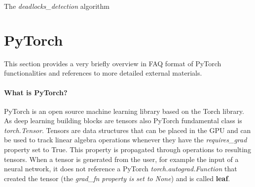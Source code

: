 \documentclass[11pt, a4paper, hidelinks]{report}
\begin{document}
\begin{algorithm}[H]


\caption{The \textit{deadlocks\_detection} algorithm}\label{alg:deadlocks}
\end{algorithm}

\newpage

\section{PyTorch}\label{sec:pytorch}
This section provides a very briefly overview in FAQ format of PyTorch functionalities and references to more detailed external materials.

\paragraph{What is PyTorch?}\label{par:what-is-pytorch}
PyTorch is an open source machine learning library based on the Torch library.
As deep learning building blocks are tensors also PyTorch fundamental class is \textit{torch.Tensor}.
Tensors are data structures that can be placed in the GPU and can be used to track linear algebra operations whenever they have the \textit{requires\_grad} property set to True.
This property is propagated through operations to resulting tensors.
When a tensor is generated from the user, for example the input of a neural network, it does not reference a PyTorch \textit{torch.autograd.Function} that created the tensor (the \textit{grad\_fn property is set to None}) and is called \textbf{leaf}.
\end{document}
